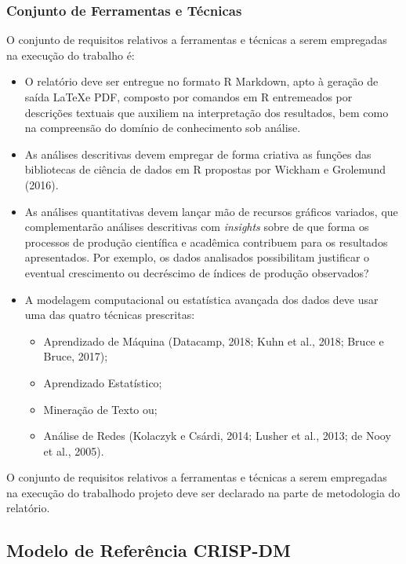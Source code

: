 \documentclass[]{article}
\providecommand{\tightlist}{%
  \setlength{\itemsep}{0pt}\setlength{\parskip}{0pt}}
\begin{document}
\subsubsection{Conjunto de Ferramentas e
Técnicas}\label{conjunto-de-ferramentas-e-tecnicas}

O conjunto de requisitos relativos a ferramentas e técnicas a serem
empregadas na execução do trabalho é:

\begin{itemize}
\tightlist
\item
  O relatório deve ser entregue no formato R Markdown, apto à geração de
  saída \LaTeX e PDF, composto por comandos em R entremeados por
  descrições textuais que auxiliem na interpretação dos resultados, bem
  como na compreensão do domínio de conhecimento sob análise.
\item
  As análises descritivas devem empregar de forma criativa as funções
  das bibliotecas de ciência de dados em R propostas por Wickham e
  Grolemund (2016).
\item
  As análises quantitativas devem lançar mão de recursos gráficos
  variados, que complementarão análises descritivas com \emph{insights}
  sobre de que forma os processos de produção científica e acadêmica
  contribuem para os resultados apresentados. Por exemplo, os dados
  analisados possibilitam justificar o eventual crescimento ou
  decréscimo de índices de produção observados?
\item
  A modelagem computacional ou estatística avançada dos dados deve usar
  uma das quatro técnicas prescritas:

  \begin{itemize}
  \tightlist
  \item
    Aprendizado de Máquina (Datacamp, 2018; Kuhn et al., 2018; Bruce e
    Bruce, 2017);
  \item
    Aprendizado Estatístico;
  \item
    Mineração de Texto ou;
  \item
    Análise de Redes (Kolaczyk e Csárdi, 2014; Lusher et al., 2013; de
    Nooy et al., 2005).
  \end{itemize}
\end{itemize}

O conjunto de requisitos relativos a ferramentas e técnicas a serem
empregadas na execução do trabalhodo projeto deve ser declarado na parte
de metodologia do relatório.

\subsection{Modelo de Referência
CRISP-DM}\label{modelo-de-referencia-crisp-dm}
\end{document}
